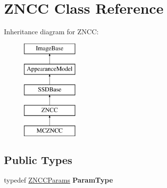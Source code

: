 \hypertarget{classZNCC}{\section{Z\-N\-C\-C Class Reference}
\label{classZNCC}
}
Inheritance diagram for Z\-N\-C\-C\-:\begin{figure}[H]
\begin{center}
\leavevmode
\includegraphics[height=5.000000cm]{classZNCC}
\end{center}
\end{figure}
\subsection*{Public Types}
\begin{DoxyCompactItemize}
\item 
\hypertarget{classZNCC_a50aa96a2c314d3da2d74475c4aaabab6}{typedef \hyperlink{structZNCCParams}{Z\-N\-C\-C\-Params} {\bfseries Param\-Type}}\label{classZNCC_a50aa96a2c314d3da2d74475c4aaabab6}

\end{DoxyCompactItemize}

